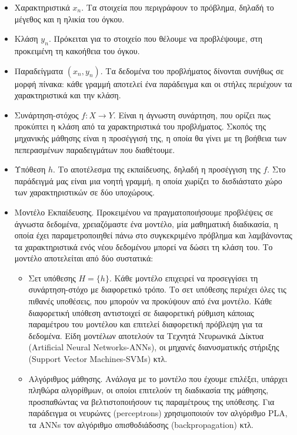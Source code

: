 \begin{itemize}
	\item Χαρακτηριστικά $x_n$. Τα στοιχεία που περιγράφουν το πρόβλημα, δηλαδή το μέγεθος και η ηλικία του όγκου.
	\item Κλάση $y_n$. Πρόκειται για το στοιχείο που θέλουμε να προβλέψουμε, στη προκειμένη τη κακοήθεια του όγκου.
	\item Παραδείγματα $(x_n, y_n)$. Τα δεδομένα του προβλήματος δίνονται συνήθως σε μορφή πίνακα: κάθε γραμμή αποτελεί ένα παράδειγμα και οι στήλες περιέχουν τα χαρακτηριστικά και την κλάση.
	\item Συνάρτηση-στόχος $f: X \rightarrow Y$. Είναι η άγνωστη συνάρτηση, που ορίζει πως προκύπτει η κλάση από τα χαρακτηριστικά του προβλήματος. Σκοπός της μηχανικής μάθησης είναι η προσέγγισή της, η οποία θα γίνει με τη βοήθεια των πεπερασμένων παραδειγμάτων που διαθέτουμε.
	\item Υπόθεση $h$. Το αποτέλεσμα της εκπαίδευσης, δηλαδή η προσέγγιση της $f$. Στο παράδειγμά μας είναι μια νοητή γραμμή, η οποία χωρίζει το δισδιάστατο χώρο των χαρακτηριστικών σε δύο υποχώρους.
	\item Μοντέλο Εκπαίδευσης. Προκειμένου να πραγματοποιήσουμε προβλέψεις σε άγνωστα δεδομένα, χρειαζόμαστε ένα μοντέλο, μία μαθηματική διαδικασία, η οποία έχει παραμετροποιηθεί πάνω στο συγκεκριμένο πρόβλημα και λαμβάνοντας τα χαρακτηριστικά ενός νέου δεδομένου μπορεί να δώσει τη κλάση του. Το μοντέλο αποτελείται από δύο συστατικά:
	\begin{itemize}
		\item Σετ υπόθεσης $H = \{h\}$. Κάθε μοντέλο επιχειρεί να προσεγγίσει τη συνάρτηση-στόχο με διαφορετικό τρόπο. Το σετ υπόθεσης περιέχει όλες τις πιθανές υποθέσεις, που μπορούν να προκύψουν από ένα μοντέλο. Κάθε διαφορετική υπόθεση αντιστοιχεί σε διαφορετική ρύθμιση κάποιας παραμέτρου του μοντέλου και επιτελεί διαφορετική πρόβλεψη για τα δεδομένα. Είδη μοντέλων αποτελούν τα Τεχνητά Νευρωνικά Δίκτυα (Artificial Neural Networks-ANNs), οι μηχανές διανυσματικής στήριξης (Support Vector Machines-SVMs) κτλ.
		\item Αλγόριθμος μάθησης. Ανάλογα με το μοντέλο που έχουμε επιλέξει, υπάρχει πληθώρα αλγορίθμων, οι οποίοι επιτελούν τη διαδικασία της μάθησης, προσπαθώντας να βελτιστοποιήσουν τις παραμέτρους της υπόθεσης. Για παράδειγμα οι νευρώνες (perceptrons) χρησιμοποιούν τον αλγόριθμο PLA, τα \gls{ANNs} τον αλγόριθμο οπισθοδιάδοσης (backpropagation) κτλ.    
	\end{itemize}
\end{itemize}
